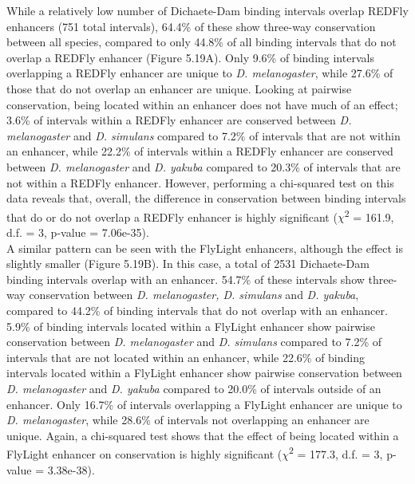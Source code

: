 While a relatively low number of Dichaete-Dam binding intervals overlap REDFly enhancers (751 total intervals), 64.4\% of these show three-way conservation between all species, compared to only 44.8\% of all binding intervals that do not overlap a REDFly enhancer (Figure 5.19A). Only 9.6\% of binding intervals overlapping a REDFly enhancer are unique to \emph{D. melanogaster}, while 27.6\% of those that do not overlap an enhancer are unique. Looking at pairwise conservation, being located within an enhancer does not have much of an effect; 3.6\% of intervals within a REDFly enhancer are conserved between \emph{D. melanogaster} and \emph{D. simulans} compared to 7.2\% of intervals that are not within an enhancer, while 22.2\% of intervals within a REDFly enhancer are conserved between \emph{D. melanogaster} and \emph{D. yakuba} compared to 20.3\% of intervals that are not within a REDFly enhancer. However, performing a chi-squared test on this data reveals that, overall, the difference in conservation between binding intervals that do or do not overlap a REDFly enhancer is highly significant (\(\chi\)\textsuperscript{2} = 161.9, d.f. = 3, p-value = 7.06e-35).\\
 
A similar pattern can be seen with the FlyLight enhancers, although the effect is slightly smaller (Figure 5.19B). In this case, a total of 2531 Dichaete-Dam binding intervals overlap with an enhancer. 54.7\% of these intervals show three-way conservation between \emph{D. melanogaster, D. simulans} and \emph{D. yakuba}, compared to 44.2\% of binding intervals that do not overlap with an enhancer. 5.9\% of binding intervals located within a FlyLight enhancer show pairwise conservation between \emph{D. melanogaster} and \emph{D. simulans} compared to 7.2\% of intervals that are not located within an enhancer, while 22.6\% of binding intervals located within a FlyLight enhancer show pairwise conservation between \emph{D. melanogaster} and \emph{D. yakuba} compared to 20.0\% of intervals outside of an enhancer. Only 16.7\% of intervals overlapping a FlyLight enhancer are unique to \emph{D. melanogaster}, while 28.6\% of intervals not overlapping an enhancer are unique. Again, a chi-squared test shows that the effect of being located within a FlyLight enhancer on conservation is highly significant (\(\chi\)\textsuperscript{2} = 177.3, d.f. = 3, p-value = 3.38e-38).\\

